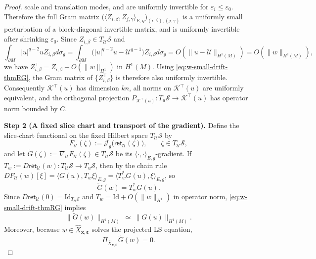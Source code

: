 \documentclass[11pt,reqno,a4paper]{amsart}
\numberwithin{equation}{section}
\theoremstyle{plain}
\theoremstyle{remark}
\theoremstyle{plain}
\begin{document}
\begin{proof}
scale and translation modes, and are uniformly invertible for $\varepsilon_i\le\varepsilon_0$.
Therefore the full Gram matrix
$\big(\langle Z_{i,\beta},Z_{j,\gamma}\rangle_{E,g}\big)_{(i,\beta),(j,\gamma)}$
is a uniformly small perturbation of a block-diagonal invertible matrix, and is uniformly invertible after
shrinking $\varepsilon_0$.
Since $Z_{i,\beta}\in T_{\mathcal U}\mathcal S$ and
\[
\int_{\partial M}|u|^{q-2}uZ_{i,\beta}d\sigma_g
=\int_{\partial M}\big(|u|^{q-2}u-\mathcal U^{q-1}\big)Z_{i,\beta}d\sigma_g
=O(\|u-\mathcal U\|_{H^1(M)})=O(\|w\|_{H^1(M)}),
\]
we have $Z_{i,\beta}^{\top}=Z_{i,\beta}+O(\|w\|_{H^1})$ in $H^1(M)$.
Using \eqref{eq:w-small-drift-thmRG}, the Gram matrix of $\{Z_{i,\beta}^{\top}\}$ is therefore also uniformly invertible.
Consequently $\mathcal K^{\top}(u)$ has dimension $kn$, all norms on $\mathcal K^{\top}(u)$ are uniformly equivalent,
and the orthogonal projection $P_{\mathcal K^{\top}(u)}:T_u\mathcal S\to\mathcal K^{\top}(u)$ has operator norm bounded by $C$.

\smallskip\noindent
\textbf{Step 2 (A fixed slice chart and transport of the gradient).}
Define the slice-chart functional on the fixed Hilbert space $T_{\mathcal U}\mathcal S$ by
\[
F_{\mathcal U}(\zeta):=\mathcal J_g\big(\mathsf{ret}_{\mathcal U}(\zeta)\big),
\qquad \zeta\in T_{\mathcal U}\mathcal S,
\]
and let $\widetilde G(\zeta):=\nabla_{\mathcal U}F_{\mathcal U}(\zeta)\in T_{\mathcal U}\mathcal S$
be its $\langle\cdot,\cdot\rangle_{E,g}$-gradient.
If $T_w:=D\mathsf{ret}_{\mathcal U}(w):T_{\mathcal U}\mathcal S\to T_u\mathcal S$, then by the chain rule
$DF_{\mathcal U}(w)[\xi]=\langle G(u),T_w\xi\rangle_{E,g}
=\langle T_w^{\ast}G(u),\xi\rangle_{E,g}$,
so
\begin{equation}\label{eq:chart-gradient-transport}
\widetilde G(w)=T_w^{\ast}G(u).
\end{equation}
Since $D\mathsf{ret}_{\mathcal U}(0)=\mathrm{Id}_{T_{\mathcal U}\mathcal S}$ and
$T_w=\mathrm{Id}+O(\|w\|_{H^1})$ in operator norm, \eqref{eq:w-small-drift-thmRG} implies
\begin{equation}\label{eq:chart-gradient-equiv}
\|\widetilde G(w)\|_{H^1(M)}\ \simeq\ \|G(u)\|_{H^1(M)}.
\end{equation}
Moreover, because $w\in\widehat X_{\mathbf x,\boldsymbol\varepsilon}$ solves the projected LS equation,
\begin{equation}\label{eq:chart-LS-equation}
\Pi_{\widehat X_{\mathbf x,\boldsymbol\varepsilon}}\widetilde G(w)=0.
\end{equation}


\end{proof}
\end{document}
